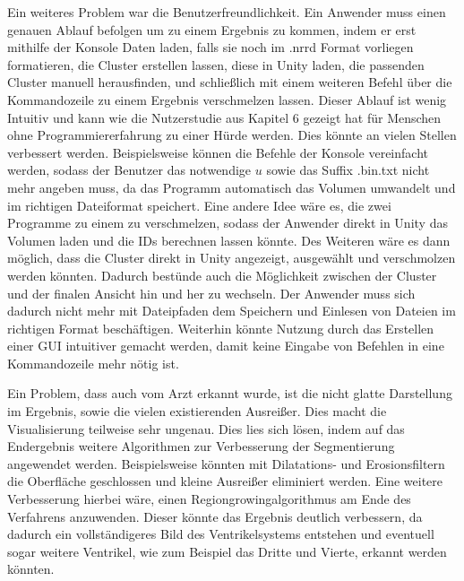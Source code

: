 Ein weiteres Problem war die Benutzerfreundlichkeit. Ein Anwender muss einen genauen Ablauf befolgen um zu einem Ergebnis zu kommen, indem er erst mithilfe der Konsole Daten laden, falls sie noch im .nrrd Format vorliegen formatieren, die Cluster erstellen lassen, diese in Unity laden, die passenden Cluster manuell herausfinden, und schließlich mit einem weiteren Befehl über die Kommandozeile zu einem Ergebnis verschmelzen lassen. Dieser Ablauf ist wenig Intuitiv und kann wie die Nutzerstudie aus Kapitel 6 gezeigt hat für Menschen ohne Programmiererfahrung zu einer Hürde werden.
\newline
Dies könnte an vielen Stellen verbessert werden. Beispielsweise können die Befehle der Konsole vereinfacht werden, sodass der Benutzer das notwendige $u$ sowie das Suffix .bin.txt nicht mehr angeben muss, da das Programm automatisch das Volumen umwandelt und im richtigen Dateiformat speichert.
\newline
Eine andere Idee wäre es, die zwei Programme zu einem zu verschmelzen, sodass der Anwender direkt in Unity das Volumen laden und die IDs berechnen lassen könnte.
\newline
Des Weiteren wäre es dann möglich, dass die Cluster direkt in Unity angezeigt, ausgewählt und verschmolzen werden könnten. Dadurch bestünde auch die Möglichkeit zwischen der Cluster und der finalen Ansicht hin und her zu wechseln.
\newline
Der Anwender muss sich dadurch nicht mehr mit Dateipfaden dem Speichern und Einlesen von Dateien im richtigen Format beschäftigen.
\newline
Weiterhin könnte Nutzung durch das Erstellen einer GUI intuitiver gemacht werden, damit keine Eingabe von Befehlen in eine Kommandozeile mehr nötig ist.


Ein Problem, dass auch vom Arzt erkannt wurde, ist die nicht glatte Darstellung im Ergebnis, sowie die vielen existierenden Ausreißer. Dies macht die Visualisierung teilweise sehr ungenau.
\newline
Dies lies sich lösen, indem auf das Endergebnis weitere Algorithmen zur Verbesserung der Segmentierung angewendet werden.
\newline
Beispielsweise könnten mit Dilatations- und Erosionsfiltern die Oberfläche geschlossen und kleine Ausreißer eliminiert werden.
\newline
Eine weitere Verbesserung hierbei wäre, einen Regiongrowingalgorithmus am Ende des Verfahrens anzuwenden. Dieser könnte das Ergebnis deutlich verbessern, da dadurch ein vollständigeres Bild des Ventrikelsystems entstehen und eventuell sogar weitere Ventrikel, wie zum Beispiel das Dritte und Vierte, erkannt werden könnten.


